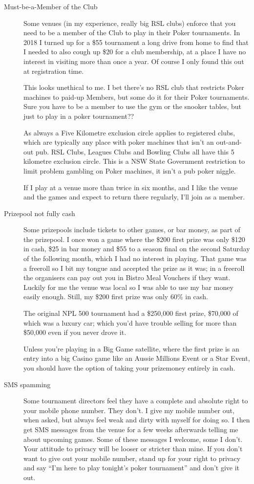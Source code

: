 \begin{description}
\item[Must-be-a-Member of the Club] Some venues (in my experience,
really big RSL clubs) enforce that you need to be a member of the Club
to play in their Poker tournaments. In 2018 I turned up for a \$55
tournament a long drive from home to find that I needed to also cough
up \$20 for a club membership, at a place I have no interest in visiting
more than once a year. Of course I only found this out at registration
time.

This looks unethical to me. I bet there's no RSL club that
restricts Poker machines to paid-up Members, but some do it for
their Poker tournaments. Sure you have to be a member to use
the gym or the snooker tables, but just to play in a poker
tournament??

As always a Five Kilometre exclusion circle applies to registered
clubs, which are typically any place with poker machines that isn't an
out-and-out pub. RSL Clubs, Leagues Clubs and Bowling Clubs all have
this 5 kilometre exclusion circle. This is a NSW State Government
restriction to limit problem gambling on Poker machines, it isn't a
pub poker niggle.

If I play at a venue more than twice in six months, and I like the
venue and the games and expect to return there regularly, I'll join as
a member.

\item[Prizepool not fully cash] Some prizepools include tickets
to other games, or bar money, as part of the prizepool. I once won a game
where the \$200 first prize was only \$120 in cash, \$25 in bar money
and \$55 to a season final on the second Saturday of the following month,
which I had no interest in playing. That game was a freeroll so I bit
my tongue and accepted the prize as it was; in a freeroll the organisers
can pay out you in Bistro Meal Vouchers if they want. Luckily for me the venue
was local so I was able to use my bar money easily enough. Still, my
\$200 first prize was only 60\% in cash.

The original NPL 500 tournament had a \$250,000 first prize, \$70,000 of
which was a luxury car; which you'd have trouble selling for more
than \$50,000 even if you never drove it.

Unless you're playing in a Big Game satellite, where the first prize
is an entry into a big Casino game like an Aussie Millions Event or a
Star Event, you should have the option of taking your prizemoney
entirely in cash.

\item[SMS spamming] Some tournament directors feel they have a
complete and absolute right to your mobile phone number. They don't.
I give my mobile number out, when asked, but always feel weak and
dirty with myself for doing so. I then get SMS messages from the venue
for a few weeks afterwards telling me about upcoming games. Some of
these messages I welcome, some I don't. Your attitude to privacy will
be looser or stricter than mine. If you don't want to give out your
mobile number, stand up for your right to privacy and say ``I'm here
to play tonight's poker tournament'' and don't give it out.


\end{description}
